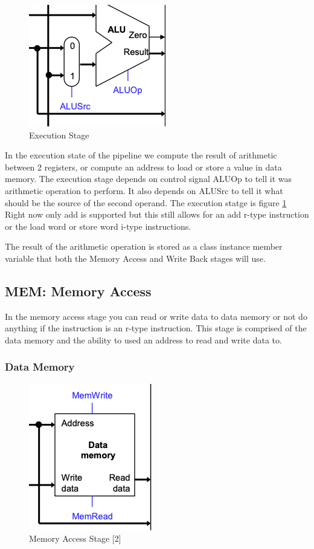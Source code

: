 \documentclass[conference]{IEEEtran}
\begin{document}
\begin{figure}
    \centering
    \includegraphics[scale=.4]{execution.png}
    \caption{Execution Stage}
    \label{fig:execution}
\end{figure}

In the execution state of the pipeline we compute the result of arithmetic between 2 registers, or compute an address to load or store a value in data memory.  The execution stage depends on control signal ALUOp to tell it was arithmetic operation to perform.  It also depends on ALUSrc to tell it what should be the source of the second operand.  The execution statge is figure \ref{fig:execution}  Right now only add is supported but this still allows for an add r-type instruction or the load word or store word i-type instructions.

The result of the arithmetic operation is stored as a class instance member variable that both the Memory Access and Write Back stages will use.

\subsection{MEM: Memory Access}

In the memory access stage you can read or write data to data memory or not do anything if the instruction is an r-type instruction.  This stage is comprised of the data memory and the ability to used an address to read and write data to.

\subsubsection{Data Memory}

\begin{figure}
    \centering
    \includegraphics[scale=.4]{memoryaccess.png}
    \caption{Memory Access Stage [2]}
    \label{fig:memoryaccess}
\end{figure}
\end{document}
